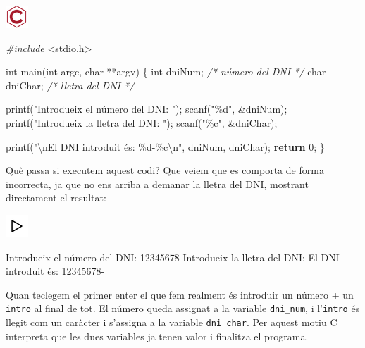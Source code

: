 \documentclass[
]{book}
\newenvironment{Shaded}{\begin{snugshade}}{\end{snugshade}}
\newcommand{\CommentTok}[1]{\textcolor[rgb]{0.56,0.35,0.01}{\textit{#1}}}
\newcommand{\ControlFlowTok}[1]{\textcolor[rgb]{0.13,0.29,0.53}{\textbf{#1}}}
\newcommand{\DataTypeTok}[1]{\textcolor[rgb]{0.13,0.29,0.53}{#1}}
\newcommand{\DecValTok}[1]{\textcolor[rgb]{0.00,0.00,0.81}{#1}}
\newcommand{\ImportTok}[1]{#1}
\newcommand{\NormalTok}[1]{#1}
\newcommand{\PreprocessorTok}[1]{\textcolor[rgb]{0.56,0.35,0.01}{\textit{#1}}}
\newcommand{\SpecialCharTok}[1]{\textcolor[rgb]{0.00,0.00,0.00}{#1}}
\newcommand{\StringTok}[1]{\textcolor[rgb]{0.31,0.60,0.02}{#1}}
\begin{document}
\includegraphics{./img/c_err.png}

\begin{Shaded}
\begin{Highlighting}[]
\PreprocessorTok{\#include }\ImportTok{\textless{}stdio.h\textgreater{}}

\DataTypeTok{int}\NormalTok{ main(}\DataTypeTok{int}\NormalTok{ argc, }\DataTypeTok{char}\NormalTok{ **argv) \{}
    \DataTypeTok{int}\NormalTok{ dniNum;    }\CommentTok{/* número del DNI */}
    \DataTypeTok{char}\NormalTok{ dniChar;  }\CommentTok{/* lletra del DNI */}

\NormalTok{    printf(}\StringTok{"Introdueix el número del DNI: "}\NormalTok{);}
\NormalTok{    scanf(}\StringTok{"\%d"}\NormalTok{, \&dniNum);}
\NormalTok{    printf(}\StringTok{"Introdueix la lletra del DNI: "}\NormalTok{);}
\NormalTok{    scanf(}\StringTok{"\%c"}\NormalTok{, \&dniChar);}

\NormalTok{    printf(}\StringTok{"}\SpecialCharTok{\textbackslash{}n}\StringTok{El DNI introduit és: \%d{-}\%c}\SpecialCharTok{\textbackslash{}n}\StringTok{"}\NormalTok{, dniNum, dniChar);}
    \ControlFlowTok{return} \DecValTok{0}\NormalTok{;}
\NormalTok{\}}
\end{Highlighting}
\end{Shaded}

Què passa si executem aquest codi? Que veiem que es comporta de forma incorrecta, ja que no ens arriba a demanar la lletra del DNI, mostrant directament el resultat:

\includegraphics{./img/play.png}

\begin{Shaded}
\begin{Highlighting}[]
\NormalTok{Introdueix el número del DNI: }\DecValTok{12345678}
\NormalTok{Introdueix la lletra del DNI:}
\NormalTok{El DNI introduit és: }\DecValTok{12345678}\NormalTok{{-}}
\end{Highlighting}
\end{Shaded}

Quan teclegem el primer enter el que fem realment és introduir un número + un \texttt{intro} al final de tot. El número queda assignat a la variable \texttt{dni\_num}, i l'\texttt{intro} és llegit com un caràcter i s'assigna a la variable \texttt{dni\_char}. Per aquest motiu C interpreta que les dues variables ja tenen valor i finalitza el programa.
\end{document}
